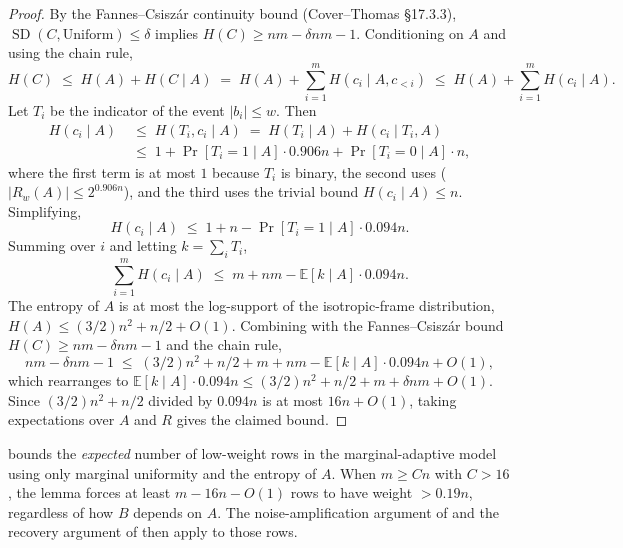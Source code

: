 \documentclass[11pt,a4paper]{article}
\theoremstyle{plain}
\theoremstyle{definition}
\newcommand{\E}{\mathbb{E}}
\begin{document}
\begin{proof}
By the Fannes--Csisz\'{a}r continuity bound (Cover--Thomas \S17.3.3), $\operatorname{SD}(C,\text{Uniform})\le\delta$ implies $H(C)\ge nm-\delta nm-1$.  Conditioning on $A$ and using the chain rule,
\[
H(C)\;\le\;H(A)+H(C\mid A)\;=\;H(A)+\sum_{i=1}^{m}H(c_i\mid A,c_{<i})
\;\le\;H(A)+\sum_{i=1}^{m}H(c_i\mid A).
\]
Let $T_i$ be the indicator of the event $|b_i|\le w$.  Then
\begin{align*}
H(c_i\mid A)
&\;\le\;H(T_i,c_i\mid A)
\;=\;H(T_i\mid A)+H(c_i\mid T_i,A) \\
&\;\le\;1+\Pr[T_i=1\mid A]\cdot0.906n+\Pr[T_i=0\mid A]\cdot n,
\end{align*}
where the first term is at most $1$ because $T_i$ is binary, the second uses  ($|R_w(A)|\le2^{0.906n}$), and the third uses the trivial bound $H(c_i\mid A)\le n$.  Simplifying,
\[
H(c_i\mid A)\;\le\;1+n-\Pr[T_i=1\mid A]\cdot0.094n.
\]
Summing over $i$ and letting $k=\sum_i T_i$,
\[
\sum_{i=1}^{m}H(c_i\mid A)
\;\le\;m+nm-\E[k\mid A]\cdot0.094n.
\]
The entropy of $A$ is at most the log-support of the isotropic-frame distribution, $H(A)\le (3/2)n^{2}+n/2+O(1)$.  Combining with the Fannes--Csisz\'{a}r bound $H(C)\ge nm-\delta nm-1$ and the chain rule,
\[
nm-\delta nm-1
\;\le\;(3/2)n^{2}+n/2+m+nm-\E[k\mid A]\cdot0.094n+O(1),
\]
which rearranges to $\E[k\mid A]\cdot0.094n\le(3/2)n^{2}+n/2+m+\delta nm+O(1)$.  Since $(3/2)n^{2}+n/2$ divided by $0.094n$ is at most $16n+O(1)$, taking expectations over $A$ and $R$ gives the claimed bound.
\end{proof}

 bounds the \emph{expected} number of low-weight rows in the marginal-adaptive model using only marginal uniformity and the entropy of $A$.  When $m\ge Cn$ with $C>16$, the lemma forces at least $m-16n-O(1)$ rows to have weight $>0.19n$, regardless of how $B$ depends on $A$.  The noise-amplification argument of  and the recovery argument of  then apply to those rows.
\end{document}
